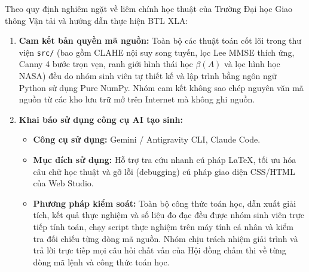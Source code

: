 Theo quy định nghiêm ngặt về liêm chính học thuật của Trường Đại học Giao thông Vận tải và hướng dẫn thực hiện BTL XLA:
\begin{enumerate}
    \item \textbf{Cam kết bản quyền mã nguồn:} Toàn bộ các thuật toán cốt lõi trong thư viện \texttt{src/} (bao gồm CLAHE nội suy song tuyến, lọc Lee MMSE thích ứng, Canny 4 bước trọn vẹn, ranh giới hình thái học $\beta(A)$ và lọc hình học NASA) đều do nhóm sinh viên tự thiết kế và lập trình bằng ngôn ngữ Python sử dụng Pure NumPy. Nhóm cam kết không sao chép nguyên văn mã nguồn từ các kho lưu trữ mở trên Internet mà không ghi nguồn.
    \item \textbf{Khai báo sử dụng công cụ AI tạo sinh:}
    \begin{itemize}
        \item \textbf{Công cụ sử dụng:} Gemini / Antigravity CLI, Claude Code.
        \item \textbf{Mục đích sử dụng:} Hỗ trợ tra cứu nhanh cú pháp LaTeX, tối ưu hóa câu chữ học thuật và gỡ lỗi (debugging) cú pháp giao diện CSS/HTML của Web Studio.
        \item \textbf{Phương pháp kiểm soát:} Toàn bộ công thức toán học, dẫn xuất giải tích, kết quả thực nghiệm và số liệu đo đạc đều được nhóm sinh viên trực tiếp tính toán, chạy script thực nghiệm trên máy tính cá nhân và kiểm tra đối chiếu từng dòng mã nguồn. Nhóm chịu trách nhiệm giải trình và trả lời trực tiếp mọi câu hỏi chất vấn của Hội đồng chấm thi về từng dòng mã lệnh và công thức toán học.
    \end{itemize}
\end{enumerate}
